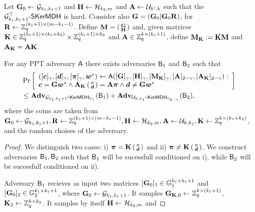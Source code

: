 \begin{lemma}
Let $\mathbf{{G}}_0\gets \mathcal{G}_{k_1,k_1+1}$ and $\mathbf{{H}}\gets\mathcal{H}_{k_2,m}$ and $\mathbf{{A}}\gets\mathcal{U}_{k',k}$ such that the $\mathcal{G}_{k_1,k_1+1}^\top\mbox{-}\mathsf{SKerMDH}$ is hard. Consider also $\mathbf{{G}} = (\mathbf{{G}}_0|\mathbf{{G}}_0\mathbf{{R}})$, for $\mathbf{{R}}\gets\mathbb{Z}_q^{(k_1+1)\times (m-k_1-1)}$. Define $\mathbf{{M}} = \left(\begin{smallmatrix}\mathbf{{G}}\\\mathbf{{H}}\end{smallmatrix}\right)$ and, given matrices $\mathbf{{K}} \in\mathbb{Z}_q^{(k_1+1)\times (k_1+k_2)}\times \mathbb{Z}_q^{(k_1+1)\times k_2}$ and $\mathbf{{A}}\in\mathbb{Z}_q^{k\times (k_1+1)}$, define $\mathbf{{M}}_{\mathbf{{K}}}:=\mathbf{{K}}\mathbf{{M}}$ and $\mathbf{{A}}_{\mathbf{{K}}} = \mathbf{{A}}\mathbf{{K}}$. 

For any PPT adversary $\mathsf{A}$ there exists adversaries $\mathsf{B}_1$ and $\mathsf{B}_2$ such that
\begin{align*}
&\Pr
\left[\begin{array}{l}
	(
		[{\boldsymbol{c}}]_\gamma,
		[{\boldsymbol{d}}]_\gamma,
		[{\boldsymbol{\pi}}]_{\gamma},
		{\boldsymbol{w}}^*
	)
		\gets \mathsf{A}
		(
			[\mathbf{{G}}]_{\gamma},
			[\mathbf{{H}}]_{\gamma},
			[\mathbf{{M}}_{\mathbf{{K}}}]_\gamma,
			[\mathbf{{A}}]_{2-\gamma},
			[\mathbf{{A}}_{\mathbf{{K}}}]_{2-\gamma}
		):\\
		{\boldsymbol{c}} = \mathbf{{G}}{\boldsymbol{w}}^*\wedge
		\mathbf{{A}}_{\mathbf{{K}}}\left(\begin{smallmatrix}{\boldsymbol{c}}\\{\boldsymbol{d}}\end{smallmatrix}\right) = \mathbf{{A}}{\boldsymbol{\pi}}\wedge
		{\boldsymbol{d}} \neq \mathbf{{G}}{\boldsymbol{w}}^*
\end{array}\right]\\
&\leq
\mathbf{Adv}_{\mathcal{G}_{k_1,k_1+1}\mbox{-}\mathsf{KerMDH}_{\mathbb{G}_\gamma}}(\mathsf{B}_1) +
\mathbf{Adv}_{\mathcal{U}_{k,k_1}\mbox{-}\mathsf{KerMDH}_{\mathbb{G}_{2-\gamma}}}(\mathsf{B}_2),
\end{align*}
where the coins are taken from $\mathbf{{G}}_0\gets\mathcal{G}_{k_1,k_1+1}, \mathbf{{R}}\gets\mathbb{Z}_q^{(k_1+1)\times(m-k_1-1)}, \mathbf{{H}}\gets\mathcal{H}_{k_2,m}, \mathbf{{A}}\gets\mathcal{U}_{k,k_1},\mathbf{{K}}\gets\mathbb{Z}_q^{k\times(k_1+k_2)}$, and the random choises of the adversary.
\end{lemma}

\begin{proof}
We distinguish two cases: i) ${\boldsymbol{\pi}} = \mathbf{{K}}\left(\begin{smallmatrix}{\boldsymbol{c}}\\{\boldsymbol{d}}\end{smallmatrix}\right)$ and ii) ${\boldsymbol{\pi }}\neq \mathbf{{K}}\left(\begin{smallmatrix}{\boldsymbol{c}}\\{\boldsymbol{d}}\end{smallmatrix}\right)$. We construct adversaries $\mathsf{B}_1,\mathsf{B}_2$ such that $\mathsf{B}_1$ will be sucessfull conditioned on i), while $\mathsf{B}_2$ will be sucessfull conditioned on ii).

Adversary $\mathsf{B}_1$ recieves as input two matrices $[\mathbf{{G}}_0]_1\in\mathbb{G}_1^{k_1\times k_1+1}$ and $[\mathbf{{G}}_0]_2\in\mathbb{G}_2^{k_1\times k_1+1}$, where $\mathbf{{G}}_0\gets \mathcal{G}_{k_1,k_1+1}$. It samples $\mathbf{{G}}_{\mathbf{{K}},0} \gets \mathbb{Z}_q^{k\times (k_1+1)}$,  $\mathbf{{K}}_2\gets\mathbb{Z}_q^{k\times k_2}$.
It samples by itself $\mathbf{{H}}\gets\mathcal{H}_{k_2,m}$ and 
\end{proof}

